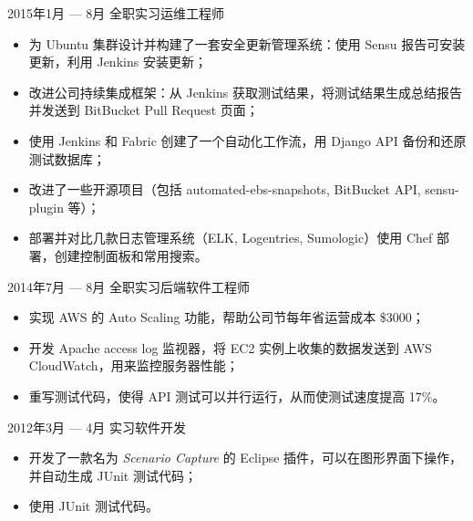 \documentclass{newresume}
\begin{document}
\smallskip

\begin{body}
	{2015年1月 --- 8月}
	{全职实习运维工程师}{}
	\begin{itemize}[noitemsep,topsep=0pt]
		\item 为 Ubuntu 集群设计并构建了一套安全更新管理系统：使用 Sensu 报告可安装更新，利用 Jenkins 安装更新；
		\item 改进公司持续集成框架：从 Jenkins 获取测试结果，将测试结果生成总结报告并发送到 BitBucket Pull Request 页面；
		\item 使用 Jenkins 和 Fabric 创建了一个自动化工作流，用 Django API 备份和还原测试数据库；
		\item 改进了一些开源项目（包括 automated-ebs-snapshots, BitBucket API, sensu-plugin 等）；
		\item 部署并对比几款日志管理系统（ELK, Logentries, Sumologic）使用 Chef 部署，创建控制面板和常用搜索。
	\end{itemize}
\end{body}

\begin{body}
	{2014年7月 --- 8月}
	{全职实习后端软件工程师}{}
	\begin{itemize}[noitemsep,topsep=0pt]
		\item 实现 AWS 的 Auto Scaling 功能，帮助公司节每年省运营成本 \$3000；
		\item 开发 Apache access log 监视器，将 EC2 实例上收集的数据发送到 AWS CloudWatch，用来监控服务器性能；
		\item 重写测试代码，使得 API 测试可以并行运行，从而使测试速度提高 17\%。
	\end{itemize}
\end{body}

\begin{body}
	{2012年3月 --- 4月}
	{实习软件开发}{}
	\begin{itemize}[noitemsep,topsep=0pt]
		\item 开发了一款名为 \textit{Scenario Capture} 的 Eclipse 插件，可以在图形界面下操作，并自动生成 JUnit 测试代码；
		\item 使用 JUnit 测试代码。
	\end{itemize}
\end{body}
\smallskip

\end{document}
